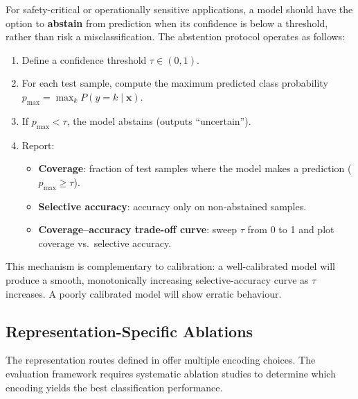 For safety-critical or operationally sensitive applications, a model
should have the option to \textbf{abstain} from prediction when its
confidence is below a threshold, rather than risk a misclassification.
The abstention protocol operates as follows:
%
\begin{enumerate}
  \item Define a confidence threshold $\tau \in (0, 1)$.
  \item For each test sample, compute the maximum predicted class
        probability $p_{\max} = \max_k P(y = k \mid \mathbf{x})$.
  \item If $p_{\max} < \tau$, the model abstains (outputs ``uncertain'').
  \item Report:
        \begin{itemize}
          \item \textbf{Coverage}: fraction of test samples where the
                model makes a prediction ($p_{\max} \geq \tau$).
          \item \textbf{Selective accuracy}: accuracy only on
                non-abstained samples.
          \item \textbf{Coverage--accuracy trade-off curve}:
                sweep $\tau$ from 0 to 1 and plot coverage vs.\
                selective accuracy.
        \end{itemize}
\end{enumerate}

This mechanism is complementary to calibration: a well-calibrated model
will produce a smooth, monotonically increasing selective-accuracy
curve as $\tau$ increases.  A poorly calibrated model will show erratic
behaviour.


\subsection{Representation-Specific Ablations}
\label{subsec:ablations}

The representation routes defined in  offer multiple
encoding choices.  The evaluation framework requires systematic
ablation studies to determine which encoding yields the best
classification performance.

